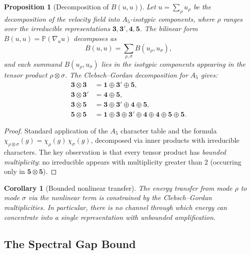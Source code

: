\documentclass[11pt,a4paper]{article}
\theoremstyle{plain}
\newtheorem{proposition}[theorem]{Proposition}
\newtheorem{corollary}[theorem]{Corollary}
\theoremstyle{definition}
\begin{document}
\begin{proposition}[Decomposition of $B(u,u)$]\label{prop:tensordecomp}
Let $u = \sum_\rho u_\rho$ be the decomposition of the velocity field into
$A_5$-isotypic components, where $\rho$ ranges over the irreducible
representations $\mathbf{3}, \mathbf{3}', \mathbf{4}, \mathbf{5}$.  The
bilinear form $B(u,u) = \mathbb{P}(\nabla_u u)$ decomposes as
\[
  B(u,u) = \sum_{\rho, \sigma} B(u_\rho, u_\sigma),
\]
and each summand $B(u_\rho, u_\sigma)$ lies in the isotypic components
appearing in the tensor product $\rho \otimes \sigma$.  The Clebsch--Gordan
decomposition for $A_5$ gives:
\begin{align}
  \mathbf{3} \otimes \mathbf{3}
    &= \mathbf{1} \oplus \mathbf{3}' \oplus \mathbf{5},
      \label{eq:CG33}\\
  \mathbf{3} \otimes \mathbf{3}'
    &= \mathbf{4} \oplus \mathbf{5},
      \label{eq:CG33p}\\
  \mathbf{3} \otimes \mathbf{5}
    &= \mathbf{3} \oplus \mathbf{3}' \oplus \mathbf{4} \oplus \mathbf{5},
      \label{eq:CG35}\\
  \mathbf{5} \otimes \mathbf{5}
    &= \mathbf{1} \oplus \mathbf{3} \oplus \mathbf{3}' \oplus
       \mathbf{4} \oplus \mathbf{4} \oplus \mathbf{5} \oplus \mathbf{5}.
      \label{eq:CG55}
\end{align}
\end{proposition}

\begin{proof}
Standard application of the $A_5$ character table and the formula
$\chi_{\rho \otimes \sigma}(g) = \chi_\rho(g)\, \chi_\sigma(g)$, decomposed
via inner products with irreducible characters.  The key observation is that
every tensor product has \emph{bounded multiplicity}: no irreducible
appears with multiplicity greater than $2$ (occurring only in
$\mathbf{5} \otimes \mathbf{5}$).
\end{proof}

\begin{corollary}[Bounded nonlinear transfer]\label{cor:boundedtransfer}
The energy transfer from mode $\rho$ to mode $\sigma$ via the nonlinear term
is constrained by the Clebsch--Gordan multiplicities.  In particular, there
is no channel through which energy can concentrate into a single
representation with unbounded amplification.
\end{corollary}

\subsection{The Spectral Gap Bound}
\end{document}
